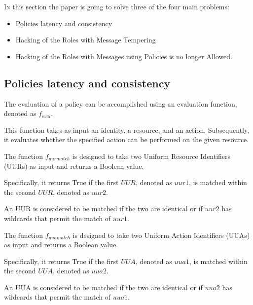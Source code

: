 \lettrine{I}{n} this section the paper is going to solve three of the four main problems:

\begin{itemize}
    \item Policies latency and consistency
    \item Hacking of the Roles with Message Tempering
    \item Hacking of the Roles with Messages using Policies is no longer Allowed.
\end{itemize}

\subsection{Policies latency and consistency}
\label{sec:policies-latency-consistency}

The evaluation of a policy can be accomplished using an evaluation function, denoted as $f_{eval}$.

This function takes as input an identity, a resource, and an action. 
Subsequently, it evaluates whether the specified action can be performed on the given resource.

\begin{boxF}
    \begin{definition}
        The function $f_{uurmatch}$ is designed to take two Uniform Resource Identifiers (UURs) as input and returns a Boolean value.
        
        Specifically, it returns True if the first $UUR$, denoted as $uur1$, is matched within the second $UUR$, denoted as $uur2$. 
        
        An UUR is considered to be matched if the two are identical or if $uur2$ has wildcards that permit the match of $uur1$.
    \end{definition}
\end{boxF}

\begin{boxF}
    \begin{definition}
        The function $f_{uuamatch}$ is designed to take two Uniform Action Identifiers (UUAs) as input and returns a Boolean value.
        
        Specifically, it returns True if the first $UUA$, denoted as $uua1$, is matched within the second $UUA$, denoted as $uua2$. 
        
        An UUA is considered to be matched if the two are identical or if $uua2$ has wildcards that permit the match of $uua1$.
    \end{definition}
\end{boxF}

